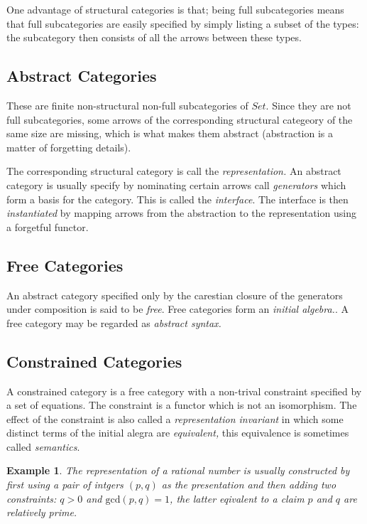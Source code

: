 \documentclass[oneside]{book}
\theoremstyle{plain}
\newtheorem{example}{Example}
\theoremstyle{definition}
\theoremstyle{plain}
\def\Set{\mathit{Set}}
\begin{document}
One advantage of structural categories is that; being full subcategories
means that full subcategories are easily specified by simply
listing a subset of the types: the subcategory then consists of
all the arrows between these types.

\subsection{Abstract Categories}
These are finite non-structural non-full subcategories of $\Set$.
Since they are not full subcategories, some arrows of the corresponding
structural categeory of the same size are missing, which is what makes
them abstract (abstraction is a matter of forgetting details).

The corresponding structural category is call the {\em representation.}
An abstract category is usually specify by nominating certain arrows
call {\em generators} which form a basis for the category. This is called
the {\em interface}. The interface is then {\em instantiated} by
mapping arrows from the abstraction to the representation using
a forgetful functor.

\subsection{Free Categories}
An abstract category specified only by the carestian closure of the generators 
under composition is said to be {\em free}. Free categories form an {\em initial
algebra.}. A free category may be regarded as {\em abstract syntax.}

\subsection{Constrained Categories}
A constrained category is a free category with a non-trival constraint 
specified by a set of equations. The constraint is a functor which is not an isomorphism. 
The effect of the constraint is also called a {\em representation invariant}
in which some distinct terms of the initial alegra are {\em equivalent,}
this equivalence is sometimes called {\em semantics}.

\begin{example}
The representation of a rational number is usually constructed by first using
a pair of intgers $(p,q)$ as the presentation and then adding two constraints:
$q>0$ and $\mathrm{gcd}(p,q)=1$, the latter eqivalent to a claim $p$ and $q$ are relatively
prime.
\end{example}
\end{document}
